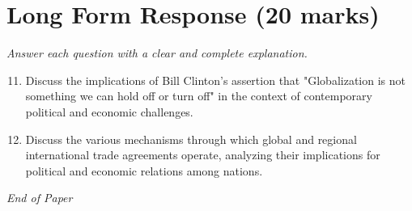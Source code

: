 \documentclass[12pt]{article}
\begin{document}
\section*{Long Form Response (20 marks)}
\textit{Answer each question with a clear and complete explanation.}
\begin{enumerate}[label=\arabic*.]
\setcounter{enumi}{10}
\item Discuss the implications of Bill Clinton's assertion that "Globalization is not something we can hold off or turn off" in the context of contemporary political and economic challenges.
\item Discuss the various mechanisms through which global and regional international trade agreements operate, analyzing their implications for political and economic relations among nations.
\end{enumerate}

\vfill
\noindent\textit{End of Paper}
\end{document}
